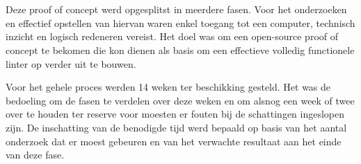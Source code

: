 
\chapter{}%
\label{ch:methodologie}


Deze proof of concept werd opgesplitst in meerdere fasen. Voor het onderzoeken en effectief opstellen van hiervan waren enkel toegang tot een computer, technisch inzicht en logisch redeneren vereist. Het doel was om een open-source proof of concept te bekomen die kon dienen als basis om een effectieve volledig functionele linter op verder uit te bouwen.

Voor het gehele proces werden 14 weken ter beschikking gesteld. Het was de bedoeling om de fasen te verdelen over deze weken en om alsnog een week of twee over te houden ter 
reserve voor moesten er fouten bij de schattingen ingeslopen zijn.
De inschatting van de benodigde tijd werd bepaald op basis van het aantal onderzoek dat er moest gebeuren en van het verwachte resultaat aan het einde van deze fase. 

